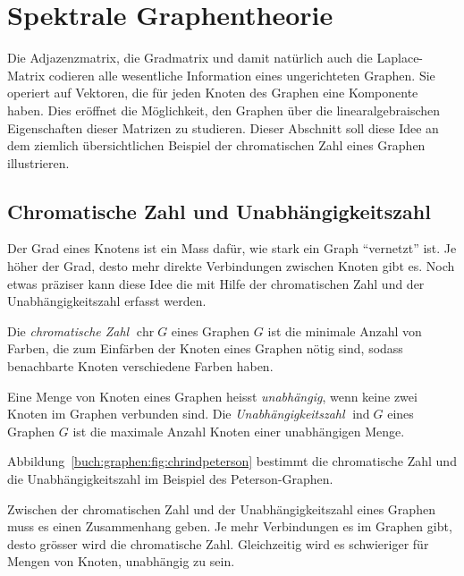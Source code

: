 %
%
%
\section{Spektrale Graphentheorie
\label{buch:section:spektrale-graphentheorie}}
Die Adjazenzmatrix, die Gradmatrix und damit natürlich auch
die Laplace-Matrix codieren alle wesentliche Information eines
ungerichteten Graphen.
Sie operiert auf Vektoren, die für jeden Knoten des Graphen eine
Komponente haben.
Dies eröffnet die Möglichkeit, den Graphen über die linearalgebraischen
Eigenschaften dieser Matrizen zu studieren.
Dieser Abschnitt soll diese Idee an dem ziemlich übersichtlichen Beispiel
der chromatischen Zahl eines Graphen illustrieren.

\subsection{Chromatische Zahl und Unabhängigkeitszahl
\label{buch:subsection:chromatische-zahl}}
Der Grad eines Knotens ist ein Mass dafür, wie stark ein Graph
``vernetzt'' ist.
Je höher der Grad, desto mehr direkte Verbindungen zwischen Knoten gibt es.
Noch etwas präziser kann diese Idee die mit Hilfe der 
chromatischen Zahl und der Unabhängigkeitszahl erfasst werden.

\begin{definition}
Die {\em chromatische Zahl} $\operatorname{chr}G$ eines Graphen $G$ ist
die minimale Anzahl von Farben, die zum Einfärben der Knoten eines Graphen
nötig sind, sodass benachbarte Knoten verschiedene Farben haben.
\end{definition}

\begin{definition}
Eine Menge von Knoten eines Graphen heisst {\em unabhängig}, wenn 
keine zwei Knoten im Graphen verbunden sind.
Die {\em Unabhängigkeitszahl} $\operatorname{ind}G$ eines Graphen $G$
ist die maximale Anzahl Knoten einer unabhängigen Menge.
\end{definition}

\begin{beispiel}
Abbildung~\ref{buch:graphen:fig:chrindpeterson} bestimmt die chromatische
Zahl und die Unabhängigkeitszahl im Beispiel des Peterson-Graphen.
\end{beispiel}

Zwischen der chromatischen Zahl und der Unabhängigkeitszahl eines Graphen
muss es einen Zusammenhang geben.
Je mehr Verbindungen es im Graphen gibt, desto grösser wird die chromatische
Zahl.
Gleichzeitig wird es schwieriger für Mengen von Knoten, unabhängig zu sein.

